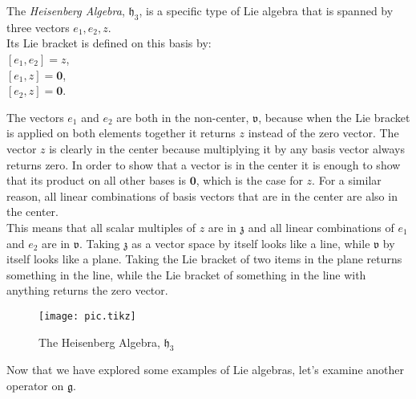 \documentclass[11 pt]{article}
\newcommand{\fg}{\mathfrak{g}}
\newcommand{\fz}{\mathfrak{z}}
\newcommand{\fv}{\mathfrak{v}}
\newcommand{\fh}{\mathfrak{h}}
\newcommand{\zvec}{\mathbf{0}}
\begin{document}
\begin{example}
    The \emph{Heisenberg Algebra}, $\fh_3$,  is a specific type of Lie algebra that
    is spanned by three vectors $e_1, e_2, z$.
    \\Its Lie bracket is defined on this basis by:
    \\$[e_1, e_2] = z$,
    \\$[e_1, z] = \zvec$,
    \\$[e_2, z] = \zvec$.
\end{example}

The vectors $e_1$ and $e_2$ are both in the non-center, $\fv$, because when the Lie bracket
is applied on both elements together it returns $z$ instead of the zero
vector.  The vector $z$ is clearly in the center because multiplying it by any basis
vector always returns zero.  In order to show that a vector is in the center
it is enough to show that its product on all other bases is $\zvec$, which is
the case for $z$.  For a similar reason, all linear combinations of basis
vectors that are in the center are also in the center.\\

This means that all scalar multiples of $z$ are in $\fz$ and all linear
combinations of $e_1$ and $e_2$ are in $\fv$. Taking $\fz$ as a vector space
by itself looks like a line, while $\fv$ by itself looks like a plane.
Taking the Lie bracket of two items in the plane returns something in the
line, while the Lie bracket of something in the line with anything returns
the zero vector.

\begin{figure}[h]
    \centering
    \texttt{[image: pic.tikz]} %
        \label{fig:pic} %
    \caption{\footnotesize The Heisenberg Algebra, $\fh_3$} %
\end{figure}

Now that we have explored some examples of Lie algebras, let's examine another
operator on $\fg$.

\pagebreak
\end{document}
